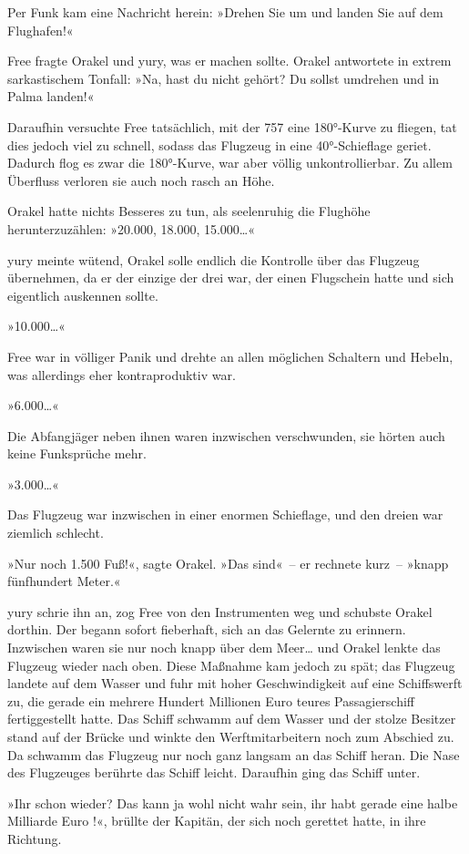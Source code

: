 Per Funk kam eine Nachricht herein: »Drehen Sie  um und landen Sie auf dem Flughafen!«

Free fragte Orakel und yury, was er machen sollte. Orakel antwortete in extrem sarkastischem Tonfall: »Na, hast du nicht gehört? Du sollst umdrehen und in Palma landen!«

Daraufhin versuchte Free tatsächlich, mit der 757 eine 180°-Kurve zu fliegen, tat dies jedoch viel zu schnell, sodass das Flugzeug in eine 40°-Schieflage geriet. Dadurch flog es zwar die 180°-Kurve, war aber völlig unkontrollierbar. Zu allem Überfluss verloren sie auch noch rasch an Höhe.

Orakel hatte nichts Besseres zu tun, als seelenruhig die Flughöhe herunterzuzählen: »20.000, 18.000, 15.000…«

yury meinte wütend, Orakel solle endlich die Kontrolle über das Flugzeug übernehmen, da er der einzige der drei war, der einen Flugschein hatte und sich eigentlich auskennen sollte.

»10.000…«

Free war in völliger Panik und drehte an allen möglichen Schaltern und Hebeln, was allerdings eher kontraproduktiv war.

»6.000…«

Die Abfangjäger neben ihnen waren inzwischen verschwunden, sie hörten auch keine Funksprüche mehr.

»3.000…«

Das Flugzeug war inzwischen in einer enormen Schieflage, und den dreien war ziemlich schlecht.

»Nur noch 1.500 Fuß!«, sagte Orakel. »Das sind«~– er rechnete kurz~– »knapp fünfhundert Meter.«

yury schrie ihn an, zog Free von den Instrumenten weg und schubste Orakel dorthin. Der begann sofort fieberhaft, sich an das Gelernte zu erinnern. Inzwischen waren sie nur noch knapp über dem Meer… und Orakel lenkte das Flugzeug wieder nach oben. Diese Maßnahme kam jedoch zu spät; das Flugzeug landete auf dem Wasser und fuhr mit hoher Geschwindigkeit auf eine Schiffswerft zu, die gerade ein mehrere Hundert Millionen Euro teures Passagierschiff fertiggestellt hatte. Das Schiff schwamm auf dem Wasser und der stolze Besitzer stand auf der Brücke und winkte den Werftmitarbeitern noch zum Abschied zu. Da schwamm das Flugzeug nur noch ganz langsam an das Schiff heran. Die Nase des Flugzeuges berührte das Schiff leicht. Daraufhin ging das Schiff unter.

»Ihr schon wieder? Das kann ja wohl nicht wahr sein, ihr habt gerade eine halbe Milliarde Euro !«, brüllte der Kapitän, der sich noch gerettet hatte, in ihre Richtung.


